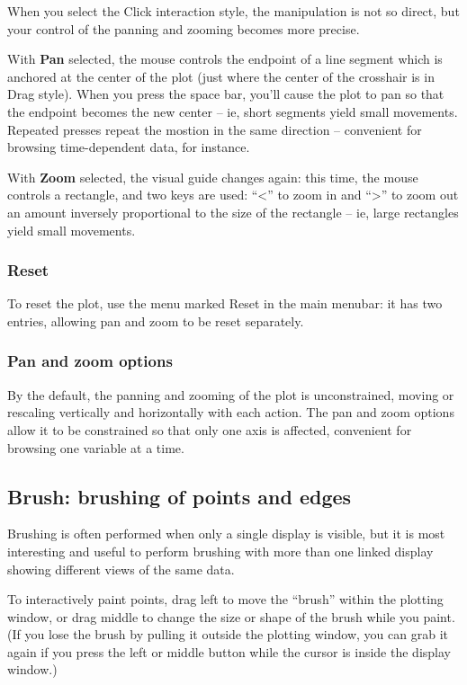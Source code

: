 \documentclass[11pt]{article}
\begin{document}
When you select the Click interaction style, the manipulation is
not so direct, but your control of the panning and zooming becomes
more precise.

With {\bf Pan} selected, the mouse controls the endpoint of a line
segment which is anchored at the center of the plot (just where the
center of the crosshair is in Drag style).  When you press the space
bar, you'll cause the plot to pan so that the endpoint becomes the
new center -- ie, short segments yield small movements.  Repeated
presses repeat the mostion in the same direction -- convenient for
browsing time-dependent data, for instance.

With {\bf Zoom} selected, the visual guide changes again:  this time,
the mouse controls a rectangle, and two keys are used:  ``<'' to
zoom in and ``>'' to zoom out an amount inversely proportional to the size
of the rectangle -- ie, large rectangles yield small movements.

\subsubsection{Reset}

To reset the plot, use the menu marked Reset in the main menubar:
it has two entries, allowing pan and zoom to be reset separately.

\subsubsection{Pan and zoom options}

By the default, the panning and zooming of the plot is unconstrained,
moving or rescaling vertically and horizontally with each action.
The pan and zoom options allow it to be constrained so that only
one axis is affected, convenient for browsing one variable at a time.

\subsection{Brush: brushing of points and edges}
\label{slbl:Brush}

Brushing is often performed when only a single display is visible,
but it is most interesting and useful to perform brushing with more
than one linked display showing different views of the same data.  

To interactively paint points, drag left to move the ``brush'' within
the plotting window, or drag middle to change the size or shape of
the brush while you paint.  (If you lose the brush by pulling it
outside the plotting window, you can grab it again if you press the
left or middle button while the cursor is inside the display window.)
\end{document}
